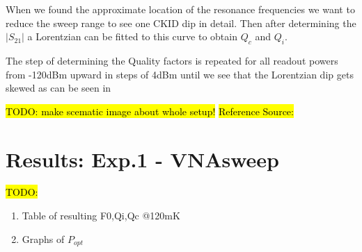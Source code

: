 When we found the approximate location of the resonance frequencies we want to reduce the sweep range to see one CKID dip in detail. Then after determining the $|S_{21}|$ a Lorentzian can be fitted to this curve to obtain $Q_c$ and $Q_i$.

The step of determining the Quality factors is repeated for all readout powers from -120dBm upward in steps of 4dBm until we see that the Lorentzian dip gets skewed as can be seen in \cite{devisserReadoutpowerHeatingHysteretic2010}

\hl{TODO: make scematic image about whole setup!}
\hl{Reference Source:}



\section{Results: Exp.1 - VNAsweep}
\hl{TODO:}
\begin{enumerate}
	\item Table of resulting F0,Qi,Qc @120mK
	\item Graphs of $P_{opt}$
\end{enumerate}



